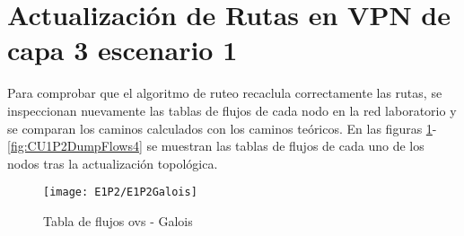 %
%
%
%
%
%


\section{Actualización de Rutas en VPN de capa 3 escenario 1}
\label{appendix6.3}

Para comprobar que el algoritmo de ruteo recaclula correctamente las rutas, se inspeccionan nuevamente las tablas de flujos de cada nodo en la red laboratorio y se comparan los caminos calculados con los caminos te\'oricos. En las figuras \ref{fig:CU1P2DumpFlows1}-\ref{fig:CU1P2DumpFlows4} se muestran las tablas de flujos de cada uno de los nodos tras la actualización topol\'ogica.\\

\newpage
\begin{figure}[ht!] 
\centering    
\texttt{[image: E1P2/E1P2Galois]}
\caption[Tabla de flujos ovs - Galois]{Tabla de flujos ovs - Galois}
\label{fig:CU1P2DumpFlows1}
\end{figure}

